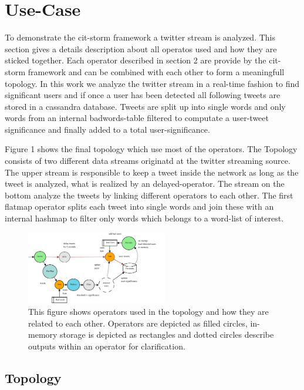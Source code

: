 \section{Use-Case}
\label{sect:useCase}

To demonstrate the cit-storm framework a twitter stream is analyzed. This section gives a details description about all operatos used and how they are sticked together. Each operator described in section 2 are provide by the cit-storm framework and can be combined with each other to form a meaningfull topology. In this work we analyze the twitter stream in a real-time fashion to find significant users and if once a user has been detected all following tweets are stored in a cassandra database. Tweets are split up into single words and only words from an internal badwords-table filtered to computate a user-tweet significance and finally added to a total user-significance. \newline

Figure 1 shows the final topology which use most of the operators. The Topology consists of two different data streams originatd at the twitter streaming source. The upper stream is responsible to keep a tweet inside the network as long as the tweet is analyzed, what is realized by an delayed-operator. The stream on the bottom analyze the tweets by linking different operators to each other. The first flatmap operator splits each tweet into single words and join these with an internal hashmap to filter only words which belongs to a word-list of interest.

\begin{figure}[h]
  \centering
  \includegraphics[width=0.55\textwidth]{images/AnalyzeTweetsTopology-eps-converted-to.pdf}
  \caption{This figure shows operators used in the topology and how they are related to each other. Operators are depicted as filled circles, in-memory storage is depicted as rectangles and dotted circles describe outputs within an operator for clarification.}
\end{figure}

\subsection{Topology}

